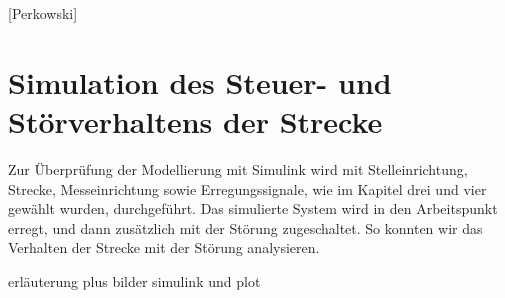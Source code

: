 
\newpage

[Perkowski]
\section{Simulation des Steuer- und Störverhaltens der Strecke} \label{Kapitel5}
Zur Überprüfung der Modellierung mit Simulink wird mit Stelleinrichtung, Strecke, Messeinrichtung sowie Erregungssignale, wie im Kapitel drei und vier gewählt wurden, durchgeführt. Das simulierte System wird in den Arbeitspunkt erregt, und dann zusätzlich mit der Störung zugeschaltet. So konnten wir das Verhalten der Strecke mit der Störung analysieren.


erläuterung plus bilder simulink und plot